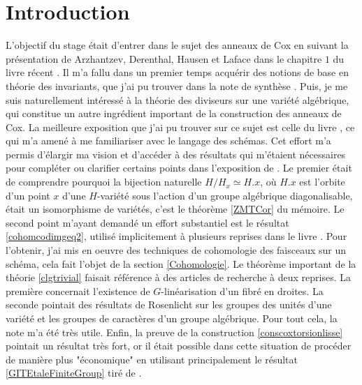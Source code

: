 
\section*{Introduction}

L'objectif du stage était d'entrer dans le sujet des anneaux de Cox en suivant la présentation de Arzhantzev, Derenthal, Hausen et Laface dans le chapitre $1$ du livre récent \cite{coxrings}. Il m'a fallu dans un premier temps acquérir des notions de base en théorie des invariants, que j'ai pu trouver dans la note de synthèse \cite{LAGBrion}. Puis, je me suis naturellement intéressé à la théorie des diviseurs sur une variété algébrique, qui constitue un autre ingrédient important de la construction des anneaux de Cox. La meilleure exposition que j'ai pu trouver sur ce sujet est celle du livre \cite{Hartshorne}, ce qui m'a amené à me familiariser avec le langage des schémas. Cet effort m'a permis d'élargir ma vision et d'accéder à des résultats qui m'étaient nécessaires pour compléter ou clarifier certains points dans l'exposition de \cite{coxrings}. Le premier était de comprendre pourquoi la bijection naturelle $H/H_x\simeq H.x$, où $H.x$ est l'orbite d'un point $x$ d'une $H$-variété sous l'action d'un groupe algébrique diagonalisable, était un isomorphisme de variétés, c'est le théorème \ref{ZMTCor} du mémoire. Le second point m'ayant demandé un effort substantiel est le résultat \ref{cohomcodimgeq2}, utilisé implicitement à plusieurs reprises dans le livre \cite{coxrings}. Pour l'obtenir, j'ai mis en oeuvre des techniques de cohomologie des faisceaux sur un schéma, cela fait l'objet de la section \ref{Cohomologie}. Le théorème important de la théorie \ref{clgtrivial} faisait référence à des articles de recherche à deux reprises. La première concernait l'existence de $G$-linéarisation d'un fibré en droites. La seconde pointait des résultats de Rosenlicht sur les groupes des unités d'une variété et les groupes de caractères d'un groupe algébrique. Pour tout cela, la note \cite{LinearizationGBrion} m'a été très utile. Enfin, la preuve de la construction \ref{conscoxtorsionlisse} pointait un résultat très fort, or il était possible dans cette situation de procéder de manière plus "économique" en utilisant principalement le résultat \ref{GITEtaleFiniteGroup} tiré de \cite{MumfordAbelianVarieties}.

